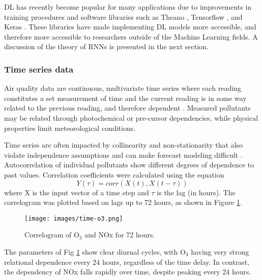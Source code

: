 DL has recently become popular for many applications due to improvements in training procedures and software libraries such as Theano \citep{Theano2016}, Tensorflow \citep{Abadi2016}, and Keras \citep{keras2015}. These libraries have made implementing DL models more accessible, and therefore more accessible to researchers outside of the Machine Learning fields. A discussion of the theory of RNNs is presented in the next section.

\subsubsection{Time series data}
Air quality data are continuous, multivariate time series where each reading constitutes a set measurement of time and the current reading is in some way related to the previous reading, and therefore dependent \citep{Gheyas2011}. Measured pollutants may be related through photochemical or pre-cursor dependencies, while physical properties limit meteorological conditions. 

Time series are often impacted by collinearity and non-stationarity that also violate independence assumptions and can make forecast modeling difficult \citep{Gheyas2011}. Autocorrelation of individual pollutants show different degrees of dependence to past values.  Correlation coefficients were calculated using the equation
%
\begin{equation}
\label{eq:corr}
Y(\tau)= corr(X(t),X(t - \tau))
\end{equation}
%
\noindent
where X is the input vector of a time step and $\tau$ is the lag (in hours). The correlogram was plotted based on lags up to 72 hours, as shown in Figure \ref{fig:serialcorr}.
%
\begin{figure}[H]
\centering
\texttt{[image: images/time-o3.png]}  %
\caption{Correlogram of O$_{3}$ and NOx for 72 hours.}
\label{fig:serialcorr}
\end{figure}
%
The parameters of Fig \ref{fig:serialcorr} show clear diurnal cycles, with O$_{3}$ having very strong relational dependence every 24 hours, regardless of the time delay. In contrast, the dependency of NOx falls rapidly over time, despite peaking every 24 hours. 

